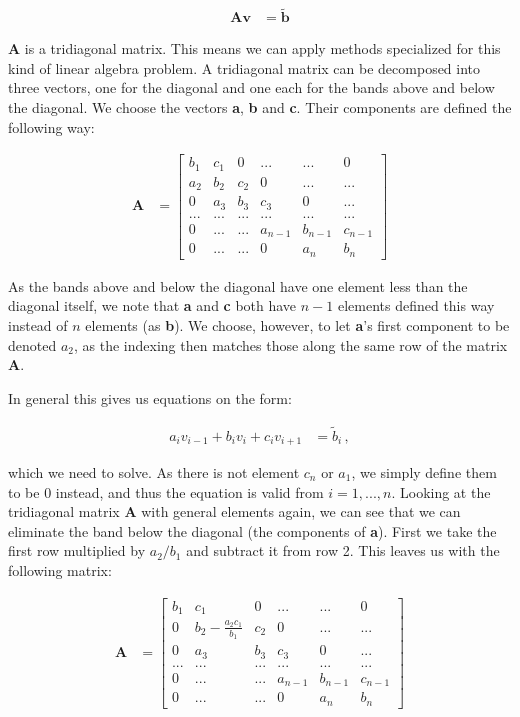 \documentclass[english,notitlepage,reprint]{revtex4-1}  %
\begin{document}
\begin{align*}
\textbf{A}\textbf{v} &= \tilde{\textbf{b}}
\end{align*}

\textbf{A} is a tridiagonal matrix. This means we can apply methods specialized for this kind of linear algebra problem. A tridiagonal matrix can be decomposed into three vectors, one for the diagonal and one each for the bands above and below the diagonal. We choose the vectors \textbf{a}, \textbf{b} and \textbf{c}. Their components are defined the following way:

\begin{align*}
\textbf{A} &= \begin{bmatrix}
b_1 & c_1 & 0 & ... & ... & 0 \\
a_2 & b_2 & c_2 & 0 & ... & ... \\
0 & a_3 & b_3 & c_3 & 0 & ... \\
... & ... & ... & ... & ... & ... \\
0 & ... & ... & a_{n-1} & b_{n-1} & c_{n-1} \\
0 & ... & ... & 0 & a_{n} & b_n 
\end{bmatrix}
\end{align*}

As the bands above and below the diagonal have one element less than the diagonal itself, we note that \textbf{a} and \textbf{c} both have $n-1$ elements defined this way instead of $n$ elements (as \textbf{b}). We choose, however, to let \textbf{a}'s first component to be denoted $a_2$, as the indexing then matches those along the same row of the matrix \textbf{A}.

In general this gives us equations on the form:

\begin{align*}
a_i v_{i-1} + b_i v_i + c_i v_{i+1} &= \tilde{b}_i \, ,
\end{align*}

which we need to solve. As there is not element $c_n$ or $a_1$, we simply define them to be 0 instead, and thus the equation is valid from $i = 1,...,n$. Looking at the tridiagonal matrix \textbf{A} with general elements again, we can see that we can eliminate the band below the diagonal (the components of \textbf{a}). First we take the first row multiplied by $a_2/b_1$ and subtract it from row 2. This leaves us with the following matrix:

\begin{align*}
\textbf{A} &= \begin{bmatrix}
b_1 & c_1 & 0 & ... & ... & 0 \\
0 & b_2 - \frac{a_2c_1}{b_1} & c_2 & 0 & ... & ... \\
0 & a_3 & b_3 & c_3 & 0 & ... \\
... & ... & ... & ... & ... & ... \\
0 & ... & ... & a_{n-1} & b_{n-1} & c_{n-1} \\
0 & ... & ... & 0 & a_{n} & b_n 
\end{bmatrix}
\end{align*}
\end{document}
